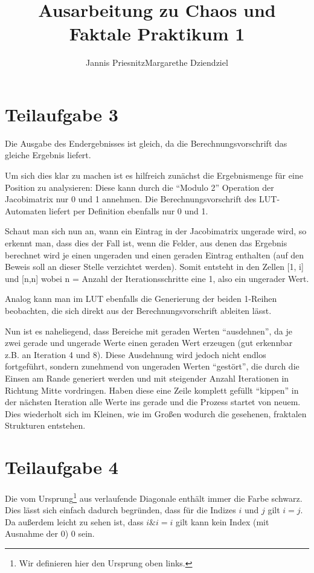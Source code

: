 \documentclass[]{article}
\title{Ausarbeitung zu Chaos und Faktale Praktikum 1}
\author{Jannis Priesnitz\space \textperiodcentered \space Margarethe Dziendziel}
\begin{document}
\maketitle
\begin{center}

\end{center}
\section{Teilaufgabe 3}
Die Ausgabe des Endergebnisses ist gleich, da die Berechnungsvorschrift das gleiche Ergebnis liefert. 

Um sich dies klar zu machen ist es hilfreich zunächst die Ergebnismenge für eine Position zu analysieren: Diese kann durch die "`Modulo 2"' Operation der Jacobimatrix nur 0 und 1 annehmen. Die Berechnungsvorschrift des LUT-Automaten liefert per Definition ebenfalls nur 0 und 1.

Schaut man sich nun an, wann ein Eintrag in der Jacobimatrix ungerade wird, so erkennt man, dass dies der Fall ist, wenn die Felder, aus denen das Ergebnis berechnet wird je einen ungeraden und einen geraden Eintrag enthalten (auf den Beweis soll an dieser Stelle verzichtet werden). Somit entsteht in den Zellen [1, i] und [n,n] wobei n = Anzahl der Iterationsschritte eine 1, also ein ungerader Wert. 

Analog kann man im LUT ebenfalls die Generierung der beiden 1-Reihen beobachten, die sich direkt aus der Berechnungsvorschrift ableiten lässt. 

Nun ist es naheliegend, dass Bereiche mit geraden Werten "`ausdehnen"', da je zwei gerade und ungerade Werte einen geraden Wert erzeugen (gut erkennbar z.B. an Iteration 4 und 8). Diese Ausdehnung wird jedoch nicht endlos fortgeführt, sondern zunehmend von ungeraden Werten "`gestört"', die durch die Einsen am Rande generiert werden und mit steigender Anzahl Iterationen in Richtung Mitte vordringen. Haben diese eine Zeile komplett gefüllt "`kippen"' in der nächsten Iteration alle Werte ins gerade und die Prozess startet von neuem. Dies wiederholt sich im Kleinen, wie im Großen wodurch die gesehenen, fraktalen Strukturen entstehen.

\section{Teilaufgabe 4}
Die vom Ursprung\footnote{Wir definieren hier den Ursprung oben links.} aus verlaufende Diagonale enthält immer die Farbe schwarz. Dies lässt sich einfach dadurch begründen, dass für die Indizes $i$ und $j$ gilt $i = j$. Da außerdem leicht zu sehen ist, dass $i \& i = i$ gilt kann kein Index (mit Ausnahme der $0$) $0$ sein.
\end{document}
